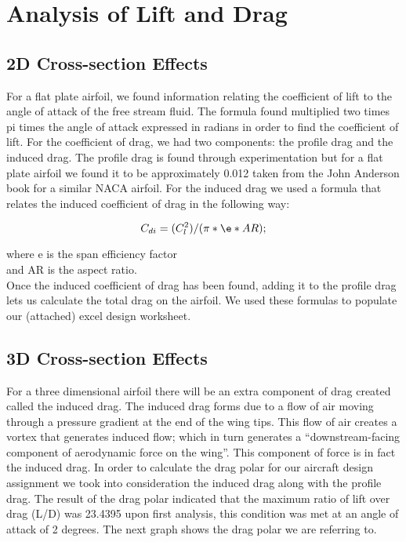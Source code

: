 \documentclass{../aiaa-pretty}
\begin{document}
\section{Analysis of Lift and Drag}

\subsection{2D Cross-section Effects}

For a flat plate airfoil, we found information relating the coefficient of lift to the angle of attack of the free stream fluid. The formula found multiplied two times pi times the angle of attack expressed in radians in order to find the coefficient of lift. For the coefficient of drag, we had two components: the profile drag and the induced drag. The profile drag is found through experimentation but for a flat plate airfoil we found it to be approximately 0.012 taken from the John Anderson book for a similar NACA airfoil. For the induced drag we used a formula that relates the induced coefficient of drag in the following way:

\begin{equation}
C_{di} = (C_{l}^{2}) / (\pi * \e * AR);
\end{equation}

where e is the span efficiency factor \\ and AR is the aspect ratio. \\

Once the induced coefficient of drag has been found, adding it to the profile drag lets us calculate the total drag on the airfoil. We used these formulas to populate our (attached) excel design worksheet.

\subsection{3D Cross-section Effects}

For a three dimensional airfoil there will be an extra component of drag created called the induced drag. The induced drag forms due to a flow of air moving through a pressure gradient at the end of the wing tips. This flow of air creates a vortex that generates induced flow; which in turn generates a “downstream-facing component of aerodynamic force on the wing”. This component of force is in fact the induced drag. In order to calculate the drag polar for our aircraft design assignment we took into consideration the induced drag along with the profile drag. The result of the drag polar indicated that the maximum ratio of lift over drag (L/D) was 23.4395 upon first analysis, this condition was met at an angle of attack of 2 degrees. The next graph shows the drag polar we are referring to.
\end{document}
